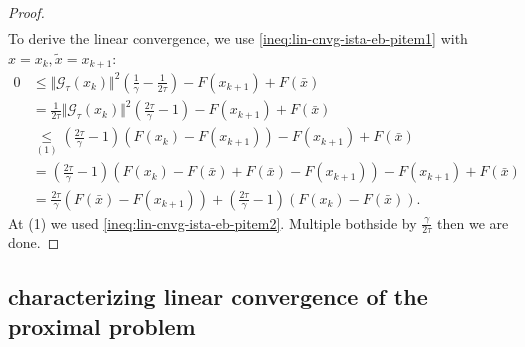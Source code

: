 \documentclass[12pt]{article}
\begin{document}
\begin{proof}
\begin{align}
            \end{align}
            To derive the linear convergence, we use \eqref{ineq:lin-cnvg-ista-eb-pitem1} with $x = x_k, \tilde x = x_{k + 1}$:
            {\allowdisplaybreaks
            \begin{align*}
                0 &\le 
                \Vert \mathcal G_\tau(x_k)\Vert^2\left(
                    \frac{1}{\gamma} - \frac{1}{2\tau} 
                \right)
                - F(x_{k + 1}) + F(\bar x)
                \\
                &= 
                \frac{1}{2\tau}\Vert \mathcal G_\tau(x_k)\Vert^2\left(
                    \frac{2\tau}{\gamma} - 1
                \right)
                - F(x_{k + 1}) + F(\bar x)
                \\
                &\underset{(1)}{\le}
                \left(
                    \frac{2\tau}{\gamma} - 1
                \right)
                \left(
                    F(x_k) - F(x_{k + 1})
                \right)
                - F(x_{k + 1}) + F(\bar x)
                \\
                &= 
                \left(
                    \frac{2\tau}{\gamma} - 1
                \right)
                \left(
                    F(x_k) - F(\bar x) + F(\bar x) - F(x_{k + 1})
                \right)
                - F(x_{k + 1}) + F(\bar x)
                \\
                &= \frac{2\tau}{\gamma}(F(\bar x) - F(x_{k + 1}))
                + \left(
                    \frac{2\tau}{\gamma} - 1
                \right)(F(x_k) - F(\bar x)). 
            \end{align*}
            }
            At (1) we used \eqref{ineq:lin-cnvg-ista-eb-pitem2}. 
            Multiple bothside by $\frac{\gamma}{2\tau}$ then we are done. 
        \end{proof}

    \subsection{characterizing linear convergence of the proximal problem}




\end{document}
